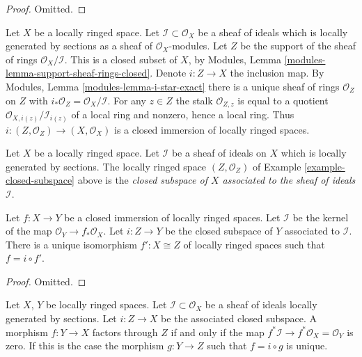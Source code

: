 \begin{proof}
Omitted.
\end{proof}

\begin{example}
\label{example-closed-subspace}
Let $X$ be a locally ringed space.
Let $\mathcal{I} \subset \mathcal{O}_X$ be a sheaf
of ideals which is locally generated by sections as a sheaf
of $\mathcal{O}_X$-modules. Let $Z$ be the support of
the sheaf of rings $\mathcal{O}_X/\mathcal{I}$.
This is a closed subset of $X$, by
Modules, Lemma \ref{modules-lemma-support-sheaf-rings-closed}.
Denote $i : Z \to X$ the inclusion map.
By Modules, Lemma \ref{modules-lemma-i-star-exact}
there is a unique sheaf of rings $\mathcal{O}_Z$ on $Z$
with $i_*\mathcal{O}_Z = \mathcal{O}_X/\mathcal{I}$.
For any $z \in Z$ the stalk $\mathcal{O}_{Z, z}$
is equal to a quotient $\mathcal{O}_{X, i(z)}/\mathcal{I}_{i(z)}$
of a local ring and nonzero, hence a local ring.
Thus $i : (Z, \mathcal{O}_Z) \to (X, \mathcal{O}_X)$ is
a closed immersion of locally ringed spaces.
\end{example}

\begin{definition}
\label{definition-closed-subspace}
Let $X$ be a locally ringed space.
Let $\mathcal{I}$ be a sheaf of ideals on $X$
which is locally generated by sections.
The locally ringed space $(Z, \mathcal{O}_Z)$
of Example \ref{example-closed-subspace} above
is the {\it closed subspace of $X$ associated to
the sheaf of ideals $\mathcal{I}$}.
\end{definition}

\begin{lemma}
\label{lemma-closed-immersion}
Let $f : X \to Y$ be a closed immersion of
locally ringed spaces. Let $\mathcal{I}$ be the
kernel of the map $\mathcal{O}_Y \to f_*\mathcal{O}_X$.
Let $i : Z \to Y$ be the closed subspace of $Y$
associated to $\mathcal{I}$.
There is a unique isomorphism $f' : X \cong Z$ of
locally ringed spaces such that $f = i \circ f'$.
\end{lemma}

\begin{proof}
Omitted.
\end{proof}

\begin{lemma}
\label{lemma-characterize-closed-subspace}
Let $X$, $Y$ be locally ringed spaces. Let
$\mathcal{I} \subset \mathcal{O}_X$ be a sheaf of ideals locally generated
by sections. Let $i : Z \to X$ be the associated closed subspace.
A morphism $f : Y \to X$ factors through $Z$ if and only if the map
$f^*\mathcal{I} \to f^*\mathcal{O}_X = \mathcal{O}_Y$
is zero. If this is the case the morphism $g : Y \to Z$
such that $f = i \circ g$ is unique.
\end{lemma}

